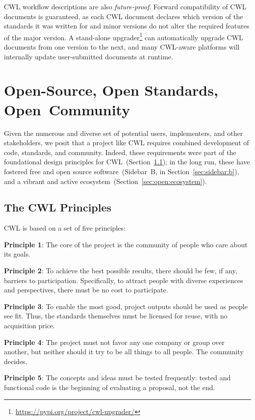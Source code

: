 \documentclass[sigconf,revew,screen,timestamp,nonacm]{acmart}
\begin{document}
CWL workflow descriptions are also \textit{future-proof}. Forward compatibility of CWL documents is guaranteed, as each CWL document declares which version of the standards it was written for and minor versions do not alter the required features of the major version. A stand-alone upgrader\footnote{\url{https://pypi.org/project/cwl-upgrader/}} can automatically upgrade CWL documents from one version to the next, and many CWL-aware platforms will internally update user-submitted documents at runtime.

\section{Open-Source, Open Standards, Open~Community} \label{sec:open}

Given the numerous and diverse set of potential users, implementers, and other stakeholders, we posit that a project like CWL requires combined development of code, standards, and community. Indeed, these requirements were part of the foundational design principles for CWL~(Section~\ref{sec:open:principles}); in the long run, these have fostered free and open source software~(Sidebar~B, in Section~\ref{sec:sidebar:b}), and a vibrant and active ecosystem~(Section~\ref{sec:open:ecosystem}). 


\subsection{The CWL Principles} \label{sec:open:principles}

CWL is based on a set of five principles:

\textbf{Principle 1}: The core of the project is the community of people who care about its goals.

\textbf{Principle 2}: To achieve the best possible results, there should be few, if any, barriers to participation. Specifically, to attract people with diverse experiences and perspectives, there must be no cost to participate.

\textbf{Principle 3}: To enable the most good, project outputs should be used as people see fit. Thus, the standards themselves must be licensed for reuse, with no acquisition price.

\textbf{Principle 4}: The project must not favor any one company or group over another, but neither should it try to be all things to all people. The community decides.

\textbf{Principle 5}: The concepts and ideas must be tested frequently: tested and functional code is the beginning of evaluating a proposal, not the end.
\end{document}
